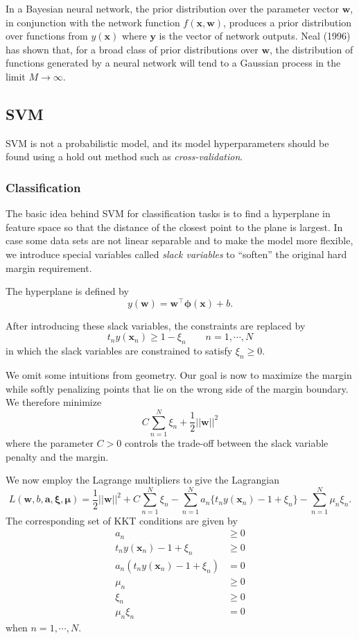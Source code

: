 \documentclass[a4paper]{report}
\renewcommand{\bf}{\mathbf}
\newcommand{\imp}[1]{{\color{blue}\textit{#1}}}
\newcommand{\bs}{\boldsymbol}
\begin{document}
In a Bayesian neural network, the prior distribution over the parameter vector $\bf{w}$, in conjunction with the network function $f(\bf{x,w})$, produces a prior distribution over functions from $y(\bf{x})$ where $\bf{y}$ is the vector of network outputs. Neal (1996) has shown that, for a broad class of prior distributions over $\bf{w}$, the distribution of functions generated by a neural network will tend to a Gaussian process in the limit $M \rightarrow \infty$.

\subsection{SVM}
SVM is not a probabilistic model, and its model hyperparameters should be found using a hold out method such as \imp{cross-validation}.
\subsubsection{Classification}
The basic idea behind SVM for classification tasks is to find a hyperplane in feature space so that the distance of the closest point to the plane is largest. In case some data sets are not linear separable and to make the model more flexible, we introduce special variables called \imp{slack variables} to ``soften'' the original hard margin requirement. 

The hyperplane is defined by
\begin{equation}
	y(\bf{w}) = \bf{w}^{\intercal} \bs{\phi}(\bf{x}) + b.
\end{equation}

After introducing these slack variables, the constraints are replaced by
\begin{equation}
	t_n y(\bf{x}_n) \geq 1 -\xi_n \qquad n = 1,\cdots,N
\end{equation}
in which the slack variables are constrained to satisfy $\xi_n \geq 0$.

We omit some intuitions from geometry. Our goal is now to maximize the margin while softly penalizing points that lie on the wrong side of the margin boundary. We therefore minimize
\begin{equation}
	C\sum_{n=1}^N \xi_n + \frac{1}{2} ||\bf{w}||^2
\end{equation}
where the parameter $C > 0$ controls the trade-off between the slack variable penalty and the margin.

We now employ the Lagrange multipliers to give the Lagrangian
\begin{equation}
	L(\bf{w},b,\bf{a},\bs{\xi},\bs{\mu}) = \frac{1}{2} ||\bf{w}||^2 + C \sum_{n=1}^N \xi_n - \sum_{n=1}^N a_n \{ t_n y(\bf{x}_n) -1 + \xi_n \} - \sum_{n=1}^N \mu_n \xi_n.
\end{equation}
The corresponding set of KKT conditions are given by
\begin{align}
	a_n &\geq 0 \\
	t_n y(\bf{x}_n) -1 + \xi_n &\geq 0 \\
	a_n(t_n y(\bf{x}_n)-1+\xi_n) &= 0 \\
	\mu_n &\geq 0 \\
	\xi_n & \geq 0 \\
	\mu_n \xi_n &= 0
\end{align}
when $n = 1,\cdots,N$.
\end{document}
